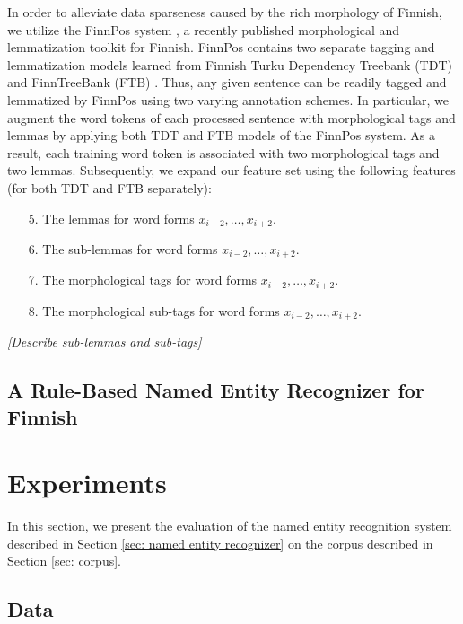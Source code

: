 \documentclass[11pt]{article}
\newcommand{\fixme}[1]{\textsl{[#1]}}
\begin{document}
In order to alleviate data sparseness caused by the rich morphology of Finnish, we utilize the FinnPos system \citep{silfverberg2016}, a recently published morphological and lemmatization toolkit for Finnish. FinnPos contains two separate tagging and lemmatization models learned from Finnish Turku Dependency Treebank (TDT) \citep{haverinen2014} and FinnTreeBank (FTB) \citep{voutilainen2011}. Thus, any given sentence can be readily tagged and lemmatized by FinnPos using two varying annotation schemes. In particular, we augment the word tokens of each processed sentence with morphological tags and lemmas by applying both TDT and FTB models of the FinnPos system. As a result, each training word token is associated with two morphological tags and two lemmas. Subsequently, we expand our feature set using the following features (for both TDT and FTB separately):

\begin{itemize}
\item[5.] The lemmas for word forms $x_{i-2}, \dots, x_{i+2}$. 
\item[6.] The sub-lemmas for word forms $x_{i-2}, \dots, x_{i+2}$. 
\item[7.] The morphological tags for word forms $x_{i-2}, \dots, x_{i+2}$.
\item[8.] The morphological sub-tags for word forms $x_{i-2}, \dots, x_{i+2}$.
\end{itemize}

\fixme{Describe sub-lemmas and sub-tags} 



\subsection{A Rule-Based Named Entity Recognizer for Finnish}


\section{Experiments}
\label{sec: experiments}

In this section, we present the evaluation of the named entity recognition system described in Section \ref{sec: named entity recognizer} on the corpus described in Section \ref{sec: corpus}.

\subsection{Data}
\label{sec: data}
\end{document}
